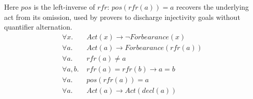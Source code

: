 \documentclass{IOS-Book-Article}
\theoremstyle{definition}
\begin{document}
\noindent Here $\mathit{pos}$ is the left-inverse of $\mathit{rfr}$:
$\mathit{pos}(\mathit{rfr}(a))=a$ recovers the underlying act
from its omission, used by provers to discharge injectivity
goals without quantifier alternation.
\begin{align*}
\forall x.\;&\mathit{Act}(x)\to\neg\mathit{Forbearance}(x)\\
\forall a.\;&\mathit{Act}(a)\to\mathit{Forbearance}(\mathit{rfr}(a))\\
\forall a.\;&\mathit{rfr}(a)\neq a\\
\forall a,b.\;&\mathit{rfr}(a)=\mathit{rfr}(b)\to a=b\\
\forall a.\;&\mathit{pos}(\mathit{rfr}(a))=a\\
\forall a.\;&\mathit{Act}(a)\to\mathit{Act}(\mathit{decl}(a))
\end{align*}
\end{document}
